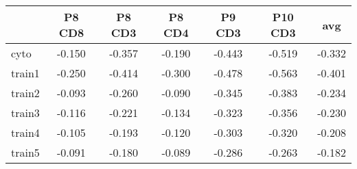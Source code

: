 \documentclass{article}
\begin{document}
\begin{tabular}{lcccccc}
   \hline  &P8 CD8& P8 CD3& P8 CD4& P9 CD3& P10 CD3& avg\\ 
\hline
cyto & -0.150 & -0.357 & -0.190 & -0.443 & -0.519 & -0.332 \\ 
  train1 & -0.250 & -0.414 & -0.300 & -0.478 & -0.563 & -0.401 \\ 
  train2 & -0.093 & -0.260 & -0.090 & -0.345 & -0.383 & -0.234 \\ 
  train3 & -0.116 & -0.221 & -0.134 & -0.323 & -0.356 & -0.230 \\ 
  train4 & -0.105 & -0.193 & -0.120 & -0.303 & -0.320 & -0.208 \\ 
  train5 & -0.091 & -0.180 & -0.089 & -0.286 & -0.263 & -0.182 \\ 
   \hline
\end{tabular}
\end{document}
